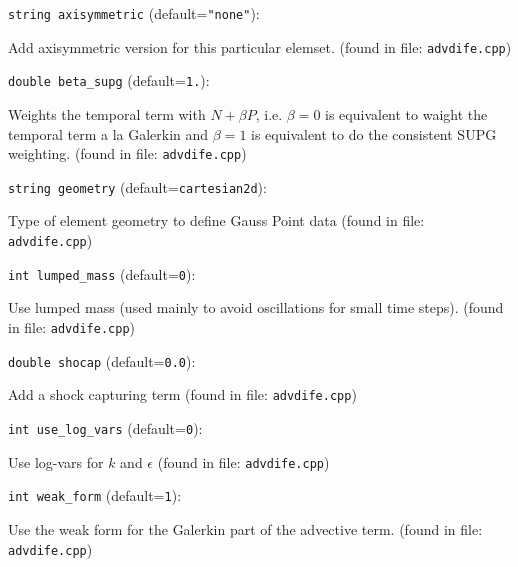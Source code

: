 \item\verb+string axisymmetric+ {\rm(default=\verb|"none"|)}:

Add axisymmetric version for this particular elemset.
 (found in file: \verb+advdife.cpp+)
\item\verb+double beta_supg+ {\rm(default=\verb|1.|)}:

Weights the temporal term with $N+\beta P$, i.e.
$\beta=0$ is equivalent to waight the temporal term a la
Galerkin and $\beta=1$ is equivalent to do the consistent SUPG weighting.
 (found in file: \verb+advdife.cpp+)
\item\verb+string geometry+ {\rm(default=\verb|cartesian2d|)}:

Type of element geometry to define Gauss Point data
 (found in file: \verb+advdife.cpp+)
\item\verb+int lumped_mass+ {\rm(default=\verb|0|)}:

Use lumped mass (used mainly to avoid oscillations for small time steps).
 (found in file: \verb+advdife.cpp+)
\item\verb+double shocap+ {\rm(default=\verb|0.0|)}:

Add a shock capturing term
 (found in file: \verb+advdife.cpp+)
\item\verb+int use_log_vars+ {\rm(default=\verb|0|)}:

Use log-vars for $k$ and $\epsilon$
 (found in file: \verb+advdife.cpp+)
\item\verb+int weak_form+ {\rm(default=\verb|1|)}:

Use the weak form for the Galerkin part of the advective term.
 (found in file: \verb+advdife.cpp+)
